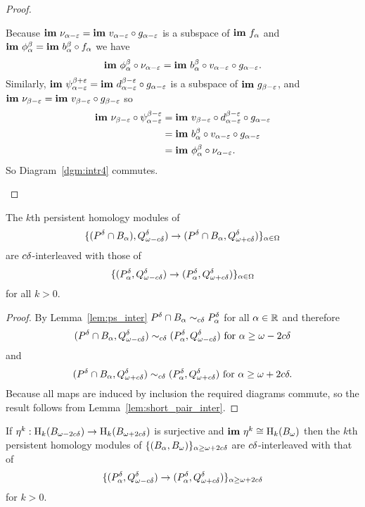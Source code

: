 \begin{proof}
\begin{enumerate}[label=\Roman*.]
    Because $\mathbf{im}~\nu_{\alpha-\varepsilon} = \mathbf{im}~v_{\alpha-\varepsilon}\circ g_{\alpha-\varepsilon}$ is a subspace of $\mathbf{im}~f_\alpha$ and $\mathbf{im}~\phi_\alpha^\beta = \mathbf{im}~b_\alpha^\beta\circ f_\alpha$ we have
    \[ \mathbf{im}~\phi_\alpha^\beta\circ \nu_{\alpha-\varepsilon} = \mathbf{im}~b_\alpha^\beta\circ v_{\alpha-\varepsilon}\circ g_{\alpha-\varepsilon}.\]
    Similarly, $\mathbf{im}~\psi_{\alpha-\varepsilon}^{\beta + \varepsilon} = \mathbf{im}~d_{\alpha-\varepsilon}^{\beta -\varepsilon}\circ g_{\alpha-\varepsilon}$ is a subspace of $\mathbf{im}~g_{\beta-\varepsilon}$, and $\mathbf{im}~\nu_{\beta -\varepsilon} = \mathbf{im}~v_{\beta -\varepsilon}\circ g_{\beta-\varepsilon}$ so
    \begin{align*}
      \mathbf{im}~\nu_{\beta -\varepsilon}\circ\psi_{\alpha-\varepsilon}^{\beta -\varepsilon} &= \mathbf{im}~v_{\beta -\varepsilon}\circ d_{\alpha-\varepsilon}^{\beta-\varepsilon}\circ g_{\alpha-\varepsilon}\\
        &=\mathbf{im}~ b_\alpha^\beta\circ v_{\alpha-\varepsilon}\circ g_{\alpha-\varepsilon}\\
        &= \mathbf{im}~\phi_\alpha^\beta\circ\nu_{\alpha-\varepsilon}.
    \end{align*}
    So Diagram~\ref{dgm:intr4} commutes.
  \end{enumerate}
\end{proof}

\begin{lemma}
  The $k$th persistent homology modules of
  \[ \{(P^{{\delta}}\cap B_\alpha), Q_{\omega - c{\delta}}^\delta)\to (P^{{\delta}}\cap B_\alpha, Q_{\omega + c{\delta}}^\delta)\}_{\alpha\in\Omega} \]
  are $c{\delta}$-interleaved with those of
  \[ \{(P^{{\delta}}_\alpha, Q_{\omega - c{\delta}}^\delta)\to (P^{{\delta}}_\alpha,Q_{\omega + c{\delta}}^\delta)\}_{\alpha\in\Omega} \]
  for all $k > 0$.
\end{lemma}
\begin{proof}
  By Lemma~\ref{lem:ps_inter} $P^{{\delta}}\cap B_\alpha\sim_{c{\delta}} P^{{\delta}}_\alpha$ for all $\alpha\in\mathbb{R}$ and therefore
  \[ (P^{{\delta}}\cap B_\alpha, Q_{\omega - c{\delta}}^\delta)\sim_{c{\delta}} (P^{{\delta}}_\alpha, Q_{\omega - c{\delta}}^\delta)\text{ for } \alpha \geq \omega - 2c{\delta}\]
  and
  \[ (P^{{\delta}}\cap B_\alpha, Q_{\omega + c{\delta}}^\delta)\sim_{c{\delta}} (P^{{\delta}}_\alpha, Q_{\omega + c{\delta}}^\delta)\text{ for }\alpha \geq \omega + 2c\delta.\]
  Because all maps are induced by inclusion the required diagrams commute, so the result follows from Lemma~\ref{lem:short_pair_inter}.
\end{proof}

\begin{corollary}\label{cor:geo_inter}
  If $\eta^k : \mathrm{H}_k(B_{\omega - 2c{\delta}})\to \mathrm{H}_k(B_{\omega + 2c{\delta}})$ is surjective and $\mathbf{im}~\eta^k\cong \mathrm{H}_k(B_\omega)$ then the $k$th persistent homology modules of
  $\{(B_\alpha, B_\omega)\}_{\alpha\geq\omega + 2c{\delta}}$ are $c{\delta}$-interleaved with that of
  \[\{(P_\alpha^{\delta}, Q_{\omega - c{\delta}}^{\delta})\to (P_\alpha^{\delta}, Q_{\omega + c{\delta}}^{\delta})\}_{\alpha\geq\omega + 2c{\delta}}\]
  for $k > 0$.
\end{corollary}
